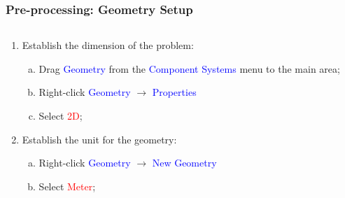 \documentclass[10pt,compress]{beamer}
\newcommand{\red}{\textcolor{red}}
\newcommand{\blue}{\textcolor{blue}}
\begin{document}
\begin{frame}
 \frametitle{Pre-processing: Geometry Setup} 
    \begin{columns}
       \begin{column}[l]{0.5\linewidth}
          \begin{enumerate}[1)]\scriptsize
             \item<1-> Establish the dimension of the problem:
                 \begin{enumerate}[a)]\scriptsize
                    \item<1-> Drag \blue{Geometry} from the \blue{Component Systems} menu to the main area;
                    \item<1-> Right-click \blue{Geometry} $\rightarrow$ \blue{Properties}
                    \item<1-> Select \red{2D};
                 \end{enumerate}
             \item<2-> Establish the unit for the geometry:
                 \begin{enumerate}[a)]\scriptsize
                    \item<2-> Right-click \blue{Geometry} $\rightarrow$ \blue{New Geometry}
                    \item<2-> Select \red{Meter};
                 \end{enumerate}
          \end{enumerate}
       \end{column}
       \begin{column}[l]{0.5\linewidth}
       \end{column}
    \end{columns}
\end{frame} 
 
\end{document}
